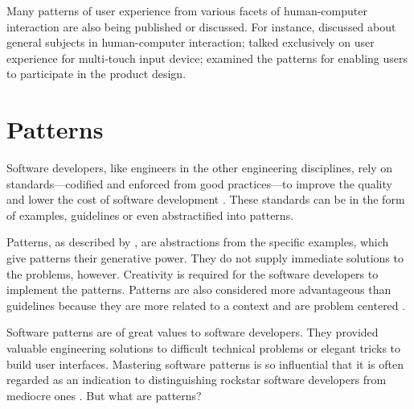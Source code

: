 \documentclass{acm_proc_article-sp}
\begin{document}
Many patterns of user experience from various facets of human-computer
interaction are also being published or discussed.  For instance,
\citet{patterns:tidwell} discussed about general subjects in
human-computer interaction; \citet{touch:boudreaux} talked exclusively
on user experience for multi-touch input device;
\citet{participatory:dearden} examined the patterns for enabling users
to participate in the product design.

\citet{unix:raymond}


\section{Patterns}
\label{sec:pattern}
Software developers, like engineers in the other engineering
disciplines, rely on standards---codified and enforced from good
practices---to improve the quality and lower the cost of software
development \citep{practice:ipenz}. These standards can be in the form
of examples, guidelines or even abstractified into patterns.

Patterns, as described by \citet{patterns:griffiths}, are abstractions
from the specific examples, which give patterns their generative
power. They do not supply immediate solutions to the problems,
however. Creativity is required for the software developers to
implement the patterns. Patterns are also considered more advantageous
than guidelines because they are more related to a context and are
problem centered \citep{patterns:welie}.

Software patterns are of great values to software developers. They
provided valuable engineering solutions to difficult technical
problems or elegant tricks to build user interfaces. Mastering
software patterns is so influential that it is often regarded as an
indication to distinguishing rockstar software developers from
mediocre ones \citep{rockstar:iskold}. But what are patterns?
\end{document}
